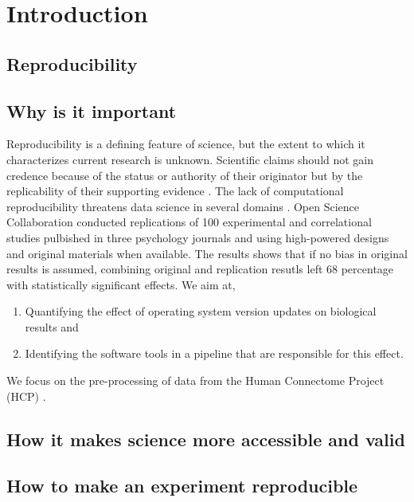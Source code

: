 \chapter{Introduction}
\section{Reproducibility}
\section{Why is it important}
Reproducibility is a defining feature of science, but the extent to which it characterizes current research is unknown. Scientific claims should not gain credence because of the status or authority of their originator but by the replicability of their supporting evidence \cite{aac4716}. The lack of computational reproducibility threatens data science in several domains \cite{Gla15}. Open Science Collaboration \cite{aac4716} conducted replications of 100 experimental and correlational studies pulbished in three psychology journals and using high-powered designs and original materials when available. The results shows that if no bias in original results is assumed, combining original and replication resutls left 68 percentage with statistically significant effects.
We aim at,
\begin{enumerate} 
  \item  Quantifying the effect of operating system version updates on biological results and 
  \item  Identifying the software tools in a pipeline that are responsible for this effect.
\end{enumerate} 
We focus on the pre-processing of data from the Human Connectome Project (HCP) \cite{Gla13}.
\section{How it makes science more accessible and valid}
\section{How to make an experiment reproducible}
